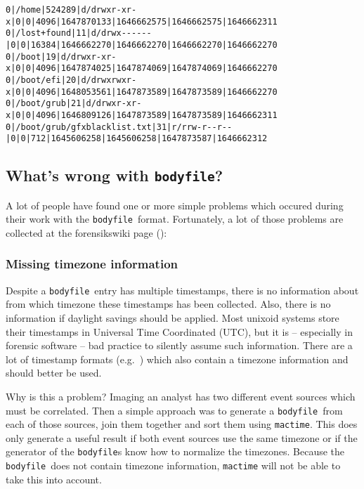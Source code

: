 \documentclass[twocolumn]{article}
\newcommand{\bodyfile}{\texttt{bodyfile}}
\begin{document}
\begin{lstfloat*}[hbt]
\caption{Sample of a \bodyfile}
\label{lst:bodyfile}
\begin{lstlisting}
0|/home|524289|d/drwxr-xr-x|0|0|4096|1647870133|1646662575|1646662575|1646662311
0|/lost+found|11|d/drwx------|0|0|16384|1646662270|1646662270|1646662270|1646662270
0|/boot|19|d/drwxr-xr-x|0|0|4096|1647874025|1647874069|1647874069|1646662270
0|/boot/efi|20|d/drwxrwxr-x|0|0|4096|1648053561|1647873589|1647873589|1646662270
0|/boot/grub|21|d/drwxr-xr-x|0|0|4096|1646809126|1647873589|1647873589|1646662311
0|/boot/grub/gfxblacklist.txt|31|r/rrw-r--r--|0|0|712|1645606258|1645606258|1647873587|1646662312
\end{lstlisting}
\end{lstfloat*}

\subsection{What's wrong with \bodyfile?}

A lot of people have found one or more simple problems which occured during their work with the \bodyfile\ format. Fortunately, a lot of those problems are collected at the forensikswiki page (\cite{bodyfile}):

\subsubsection{Missing timezone information}

Despite a \bodyfile\ entry has multiple timestamps, there is no information about from which timezone these timestamps has been collected. Also, there is no information if daylight savings should be applied. Most unixoid systems store their timestamps in Universal Time Coordinated (UTC), but it is -- especially in forensic software -- bad practice to silently assume such information. There are a lot of timestamp formats (e.g.~\cite{rfc3339}) which also contain a timezone information and should better be used.

Why is this a problem? Imaging an analyst has two different event sources which must be correlated. Then a simple approach was to generate a \bodyfile\ from each of those sources, join them together and sort them using \texttt{mactime}. This does only generate a useful result if both event sources use the same timezone or if the generator of the \bodyfile{}s know how to normalize the timezones. Because the \bodyfile\ does not contain timezone information, \texttt{mactime} will not be able to take this into account. 
\end{document}
